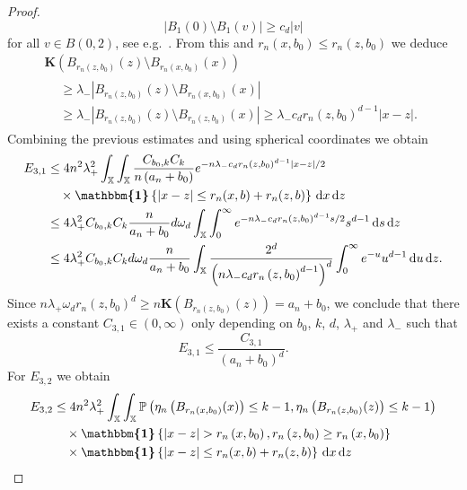 \documentclass[AHL,Unicode,longabstracts]{cedram}
\newcommand*\bK{\mathbf{K}}
\renewcommand*\P{\mathbb{P}}
\newcommand*\X{\mathbb{X}}
\newcommand*\md{\mathrm{d}}
\newcommand{\ind}{\boldsymbol{\mathbbm{1}}}
\newcommand{\set}[1]{\left\{#1\right\}}
\newcommand{\prob}[1]{\P\left(#1\right)}
\begin{document}
\begin{proof}
\[
\left|B_1(0)\setminus B_1(v)\right| \geq c_d |v|
\]
for all $v\in B(0,2)$, see e.g.~\cite[Equation~(7.5)]{PenroseGoldstein2010}. From this and $r_n(x,b_0) \leq r_n(z,b_0)$ we deduce
\begin{multline*}
\bK\left(B_{r_n\left(z,b_0\right)}(z)\setminus B_{r_n\left(x,b_0\right)}(x)\right)\\
\begin{aligned} 
& \geq \lambda_{-} \left|B_{r_n\left(z,b_0\right)}(z)\setminus B_{r_n\left(x,b_0\right)}(x)\right| \\
& \geq \lambda_{-}\left|B_{r_n\left(z,b_0\right)}(z)\setminus B_{r_n\left(z,b_0\right)}(x)\right| \geq \lambda_{-} c_d r_n\left(z,b_0\right)^{d-1} |x-z|.
\end{aligned}
\end{multline*}
Combining the previous estimates and using spherical coordinates we obtain
\begin{align*}
E_{3,1} & \leq {4} n^2 \lambda_+^2 \int_{\X}\int_{\X} \frac{C_{b_0,k} C_k}{n\left(a_n+b_0\right)} e^{-n \lambda_{-} c_d r_n\left(z,b_0\right)^{d-1} |x-z|/2} \\
&\quad\times\ind\set{|x-z| \leq r_n(x,b) + r_n(z,b)} \, \md x \, \md z \\
& \leq {4} \lambda_{+}^2C_{b_0,k}C_k\frac{n}{a_n+b_0} d\omega_d \int_{\X} \int_0^\infty e^{-n \lambda_{-} c_d r_n\left(z,b_0\right)^{d-1} s/2} s^{d-1} \, \md s \, \md z \\
& \leq {4} \lambda_{+}^2C_{b_0,k} C_k d\omega_d \frac{n}{a_n+b_0} \int_{\X} \frac{2^d}{\left(n \lambda_{-}c_d r_n\left(z,b_0\right)^{d-1}\right)^d} \int_0^\infty e^{-u} u^{d-1} \, \md u \, \md z.
\end{align*}
Since $n \lambda_{+} \omega_d r_n(z,b_0)^d\geq n\bK(B_{r_n(z,b_0)}(z)) = a_n + b_0$, we conclude that there exists a constant $C_{3,1}\in (0,\infty)$ only depending on $b_0$, $k$, $d$, $\lambda_+$ and $\lambda_-$ such that
\begin{equation}\label{e:kNNE31}
E_{3,1} \leq \frac{C_{3,1}}{\left(a_n+b_0\right)^d}.
\end{equation}
For $E_{3,2}$ we obtain
\begin{align*}
E_{3,2}
&\leq {4} n^2 \lambda_+^2 \int_{\X}\int_{\X} \prob{\eta_n \left(B_{r_n\left(x,b_0\right)}(x)\right) \leq k-1, \eta_n\left(B_{r_n\left(z,b_0\right)}(z)\right) \leq k-1} \\
& \quad\times \ind\set{|x-z|> r_n\left(x,b_0\right), r_n\left(z,b_0\right)\geq r_n\left(x,b_0\right)}\\
&\quad\times\ind\set{|x-z| \leq r_n(x,b) + r_n(z,b)} \, \md x \, \md z \\

\end{align*}
\end{proof}
\end{document}

